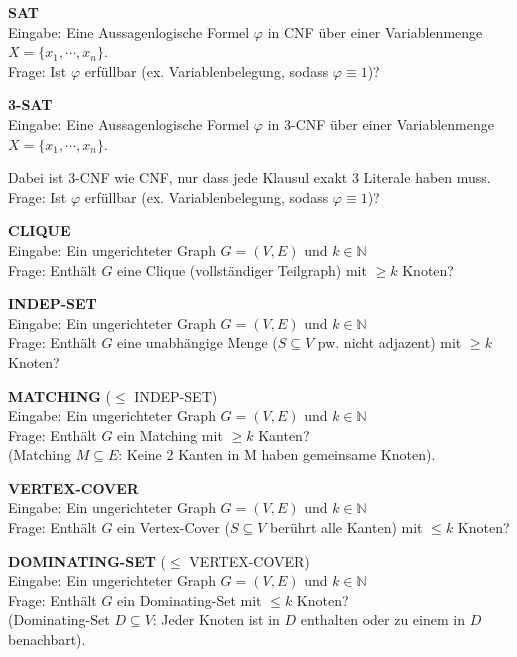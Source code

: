 \documentclass[a4paper,graphics,11pt]{article}
\begin{document}
\textbf{SAT}
\\[5pt]
Eingabe: Eine Aussagenlogische Formel $\varphi$ in CNF über einer Variablenmenge $X = \{x_1,\cdots,x_n\}$.
\\[5pt]
Frage: Ist $\varphi$ erfüllbar (ex. Variablenbelegung, sodass $\varphi \equiv 1$)?

\strut

\textbf{3-SAT}
\\[5pt]
Eingabe: Eine Aussagenlogische Formel $\varphi$ in 3-CNF über einer Variablenmenge $X = \{x_1,\cdots,x_n\}$.\\
\strut\qquad Dabei ist 3-CNF wie CNF, nur dass jede Klausul exakt 3 Literale haben muss.
\\[5pt]
Frage: Ist $\varphi$ erfüllbar (ex. Variablenbelegung, sodass $\varphi \equiv 1$)?

\strut

\textbf{CLIQUE}
\\[5pt]
Eingabe: Ein ungerichteter Graph $G = (V,E)$ und $k \in \mathbb{N}$
\\[5pt]
Frage: Enthält $G$ eine Clique (vollständiger Teilgraph) mit $\geq k$ Knoten?

\strut

\textbf{INDEP-SET}
\\[5pt]
Eingabe: Ein ungerichteter Graph $G = (V,E)$ und $k \in \mathbb{N}$
\\[5pt]
Frage: Enthält $G$ eine unabhängige Menge ($S \subseteq V$ pw. nicht adjazent) mit $\geq k$ Knoten?

\strut

\textbf{MATCHING} ($\leq$  INDEP-SET)
\\[5pt]
Eingabe: Ein ungerichteter Graph $G = (V,E)$ und $k \in \mathbb{N}$
\\[5pt]
Frage: Enthält $G$ ein Matching mit $\geq k$ Kanten?\\[5pt]
(Matching $M \subseteq E$: Keine 2 Kanten in M haben gemeinsame Knoten).


\strut

\textbf{VERTEX-COVER}
\\[5pt]
Eingabe: Ein ungerichteter Graph $G = (V,E)$ und $k \in \mathbb{N}$
\\[5pt]
Frage: Enthält $G$ ein Vertex-Cover ($S \subseteq V$ berührt alle Kanten) mit $\leq k$ Knoten?

\strut

\textbf{DOMINATING-SET} ($\leq$ VERTEX-COVER)
\\[5pt]
Eingabe: Ein ungerichteter Graph $G = (V,E)$ und $k \in \mathbb{N}$
\\[5pt]
Frage: Enthält $G$ ein Dominating-Set mit $\leq k$ Knoten?\\[5pt]
(Dominating-Set $D \subseteq V$: Jeder Knoten ist in $D$ enthalten oder zu einem in $D$ benachbart).
\end{document}
